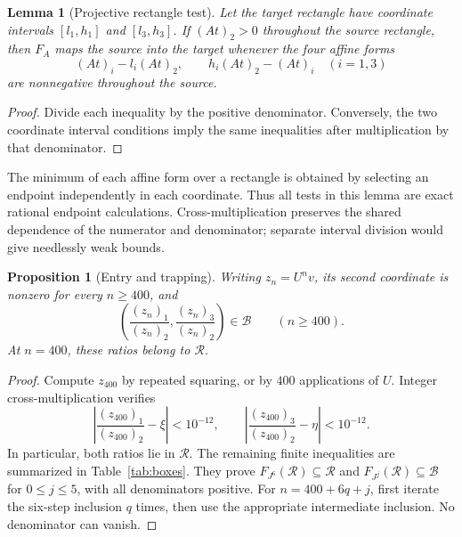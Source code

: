 \documentclass[11pt,a4paper]{article}
\newtheorem{lemma}[theorem]{Lemma}
\newtheorem{proposition}[theorem]{Proposition}
\theoremstyle{definition}\newtheorem{definition}[theorem]{Definition}
\theoremstyle{remark}\newtheorem{remark}[theorem]{Remark}
\newcommand{\cB}{\mathcal B}
\newcommand{\cR}{\mathcal R}
\begin{document}
\begin{lemma}[Projective rectangle test]
\label{lem:rectangle}
Let the target rectangle have coordinate intervals $[l_1,h_1]$ and
$[l_3,h_3]$. If $(At)_2>0$ throughout the source rectangle, then
$F_A$ maps the source into the target whenever the four affine forms
\begin{equation}
 (At)_i-l_i(At)_2,\qquad h_i(At)_2-(At)_i
 \quad(i=1,3)
 \label{eq:crossforms}
\end{equation}
are nonnegative throughout the source.
\end{lemma}
\begin{proof}
Divide each inequality by the positive denominator. Conversely, the two
coordinate interval conditions imply the same inequalities after
multiplication by that denominator.
\end{proof}

The minimum of each affine form over a rectangle is obtained by selecting
an endpoint independently in each coordinate. Thus all tests in this lemma
are exact rational endpoint calculations. Cross-multiplication preserves the
shared dependence of the numerator and denominator; separate interval
division would give needlessly weak bounds.

\begin{proposition}[Entry and trapping]
\label{prop:trap}
Writing $z_n=U^nv$, its second coordinate is nonzero for every $n\ge400$,
and
\begin{equation}
 \left(\frac{(z_n)_1}{(z_n)_2},\frac{(z_n)_3}{(z_n)_2}\right)\in\cB
 \qquad(n\ge400).
 \label{eq:orbitbox}
\end{equation}
At $n=400$, these ratios belong to $\cR$.
\end{proposition}

\begin{proof}
Compute $z_{400}$ by repeated squaring, or by $400$ applications of $U$.
Integer cross-multiplication verifies
\[
 \left|\frac{(z_{400})_1}{(z_{400})_2}-\xi\right|<10^{-12},\qquad
 \left|\frac{(z_{400})_3}{(z_{400})_2}-\eta\right|<10^{-12}.
\]
In particular, both ratios lie in $\cR$.
The remaining finite inequalities are summarized in Table~\ref{tab:boxes}.
They prove $F_{J^6}(\cR)\subseteq\cR$ and
$F_{J^j}(\cR)\subseteq\cB$ for $0\le j\le5$, with all denominators
positive. For $n=400+6q+j$, first iterate the six-step inclusion $q$ times,
then use the appropriate intermediate inclusion. No denominator can vanish.
\end{proof}
\end{document}
